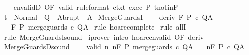\begin{isabellebody}
\ \ \isamarkupfalse%
\ cnvalidD\ {\isacharbrackleft}OF\ valid\ {\isacharbrackleft}rule{\isacharunderscore}format{\isacharbrackright}\ ctxt\ exec\ P\ t{\isacharunderscore}notin{\isacharunderscore}F{\isacharbrackright}\isanewline
\ \ \isamarkupfalse%
\ {\isachardoublequoteopen}t\ {\isasymin}\ Normal\ {\isacharbackquote}\ Q\ {\isasymunion}\ Abrupt\ {\isacharbackquote}\ A{\isachardoublequoteclose}\isacommand{{\isachardot}}\isamarkupfalse%
\isanewline
{}\isamarkupfalse%
%
\endisatagproof
{\isafoldproof}%
%
\isadelimproof
\isanewline
%
\endisadelimproof
\isanewline
{}\isamarkupfalse%
\ MergeGuardsI{\isacharcolon}\ \isanewline
\ \ \ deriv{\isacharcolon}\ {\isachardoublequoteopen}{\isasymGamma}{\isacharcomma}{\isasymTheta}{\isasymturnstile}\isactrlbsub {\isacharslash}F\isactrlesub \ P\ c\ Q{\isacharcomma}A{\isachardoublequoteclose}\isanewline
\ \ \ {\isachardoublequoteopen}{\isasymGamma}{\isacharcomma}{\isasymTheta}{\isasymturnstile}\isactrlbsub {\isacharslash}F\isactrlesub \ P\ merge{\isacharunderscore}guards\ c\ Q{\isacharcomma}A{\isachardoublequoteclose}\isanewline
%
\isadelimproof
%
\endisadelimproof
%
\isatagproof
{}\isamarkupfalse%
\ {\isacharparenleft}rule\ hoare{\isacharunderscore}complete{\isacharprime}{\isacharparenright}\isanewline
{}\isamarkupfalse%
\ {\isacharparenleft}rule\ allI{\isacharparenright}\isanewline
{}\isamarkupfalse%
\ {\isacharparenleft}rule\ MergeGuardsI{\isacharunderscore}sound{\isacharparenright}\isanewline
{}\isamarkupfalse%
\ {\isacharparenleft}iprover\ intro{\isacharcolon}\ hoare{\isacharunderscore}cnvalid\ {\isacharbrackleft}OF\ deriv{\isacharbrackright}{\isacharparenright}\isanewline
{}\isamarkupfalse%
%
\endisatagproof
{\isafoldproof}%
%
\isadelimproof
\isanewline
%
\endisadelimproof
\isanewline
{}\isamarkupfalse%
\ MergeGuardsD{\isacharunderscore}sound{\isacharcolon}\ \isanewline
\ \ \ valid{\isacharcolon}\ {\isachardoublequoteopen}{\isasymforall}n{\isachardot}\ {\isasymGamma}{\isacharcomma}{\isasymTheta}{\isasymTurnstile}n{\isacharcolon}\isactrlbsub {\isacharslash}F\isactrlesub \ P\ merge{\isacharunderscore}guards\ c\ Q{\isacharcomma}A{\isachardoublequoteclose}\isanewline
\ \ \ {\isachardoublequoteopen}{\isasymGamma}{\isacharcomma}{\isasymTheta}{\isasymTurnstile}n{\isacharcolon}\isactrlbsub {\isacharslash}F\isactrlesub \ P\ c\ Q{\isacharcomma}A{\isachardoublequoteclose}\isanewline
%
\isadelimproof

\end{isabellebody}
